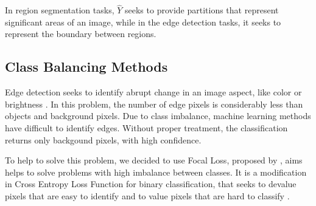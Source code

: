
In region segmentation tasks, $\hat{Y}$ seeks to provide partitions that represent significant areas of an image, while in the edge detection tasks, it seeks to represent the boundary between regions.

\subsection{Class Balancing Methods}
\label{cap5_balanc_classes}

Edge detection seeks to identify abrupt change in an image aspect, like color or brightness \cite{MARTIN:1273918}.
In this problem, the number of edge pixels is considerably less than objects and background pixels.
Due to class imbalance, machine learning methods have difficult to identify edges.
Without proper treatment, the classification returns only backgound pixels, with high confidence.

To help to solve this problem, we decided to use Focal Loss, proposed by \cite{Lin:2017}, aims helps to solve problems with high imbalance between classes.
It is a modification in Cross Entropy Loss Function for binary classification, that seeks to devalue pixels that are easy to identify and to value pixels that are hard to classify \cite{Lin:2017}.

